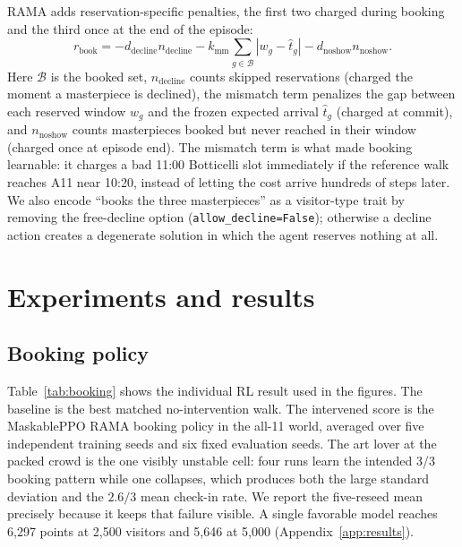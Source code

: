 \documentclass[11pt]{article}
\numberwithin{equation}{section} %
\newcommand{\code}[1]{\texttt{\small #1}}
\begin{document}
RAMA adds reservation-specific penalties, the first two charged during booking and the third once at the end
of the episode:
\begin{equation}
r_{\text{book}} =
-d_{\text{decline}}n_{\text{decline}}
-k_{\text{mm}}\sum_{g\in \mathcal{B}} |w_g-\hat t_g|
-d_{\text{noshow}}n_{\text{noshow}}.
\label{eq:book}
\end{equation}
Here $\mathcal B$ is the booked set, $n_{\text{decline}}$ counts skipped reservations (charged the moment a
masterpiece is declined), the mismatch term penalizes the gap between each reserved window $w_g$ and the
frozen expected arrival $\hat t_g$ (charged at commit), and $n_{\text{noshow}}$ counts masterpieces booked but
never reached in their window (charged once at episode end). The mismatch term is what made booking learnable:
it charges a bad 11:00 Botticelli slot immediately if the reference walk reaches A11 near 10:20, instead of
letting the cost arrive hundreds of steps later. We also encode ``books the three masterpieces'' as a
visitor-type trait by removing the free-decline option (\code{allow\_decline=False}); otherwise a decline
action creates a degenerate solution in which the agent reserves nothing at all.

\section{Experiments and results}
\label{sec:results}

\subsection{Booking policy}

Table~\ref{tab:booking} shows the individual RL result used in the figures. The baseline is the best matched
no-intervention walk. The intervened score is the MaskablePPO RAMA booking policy in the all-11 world,
averaged over five independent training seeds and six fixed evaluation seeds. The art lover at the packed
crowd is the one visibly unstable cell: four runs learn the intended 3/3 booking pattern while one collapses,
which produces both the large standard deviation and the $2.6/3$ mean check-in rate. We report the five-reseed
mean precisely because it keeps that failure visible. A single favorable model reaches 6,297 points at 2,500
visitors and 5,646 at 5,000 (Appendix~\ref{app:results}).
\end{document}
